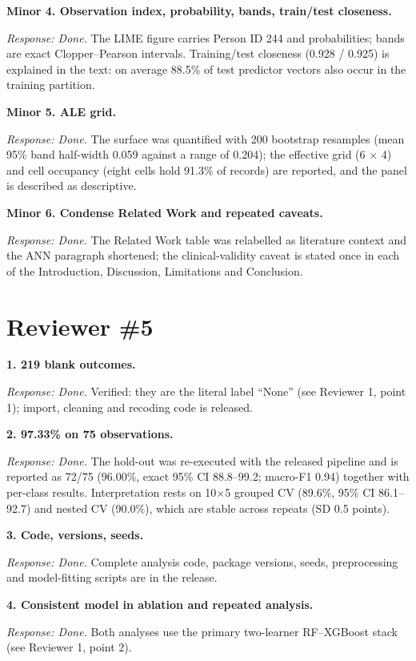 \documentclass[11pt,a4paper]{article}
\newcommand{\rc}[2]{\par\medskip\noindent\textbf{#1}\par\noindent\textit{Response: Done.} #2\par}
\begin{document}
\rc{Minor 4. Observation index, probability, bands, train/test closeness.}{The LIME figure carries Person ID 244 and probabilities; bands are exact Clopper--Pearson intervals. Training/test closeness (0.928 / 0.925) is explained in the text: on average 88.5\% of test predictor vectors also occur in the training partition.}
\rc{Minor 5. ALE grid.}{The surface was quantified with 200 bootstrap resamples (mean 95\% band half-width 0.059 against a range of 0.204); the effective grid (6 $\times$ 4) and cell occupancy (eight cells hold 91.3\% of records) are reported, and the panel is described as descriptive.}
\rc{Minor 6. Condense Related Work and repeated caveats.}{The Related Work table was relabelled as literature context and the ANN paragraph shortened; the clinical-validity caveat is stated once in each of the Introduction, Discussion, Limitations and Conclusion.}

\section*{Reviewer \#5}
\rc{1. 219 blank outcomes.}{Verified: they are the literal label ``None'' (see Reviewer 1, point 1); import, cleaning and recoding code is released.}
\rc{2. 97.33\% on 75 observations.}{The hold-out was re-executed with the released pipeline and is reported as 72/75 (96.00\%, exact 95\% CI 88.8--99.2; macro-F1 0.94) together with per-class results. Interpretation rests on 10$\times$5 grouped CV (89.6\%, 95\% CI 86.1--92.7) and nested CV (90.0\%), which are stable across repeats (SD 0.5 points).}
\rc{3. Code, versions, seeds.}{Complete analysis code, package versions, seeds, preprocessing and model-fitting scripts are in the release.}
\rc{4. Consistent model in ablation and repeated analysis.}{Both analyses use the primary two-learner RF--XGBoost stack (see Reviewer 1, point 2).}
\end{document}

